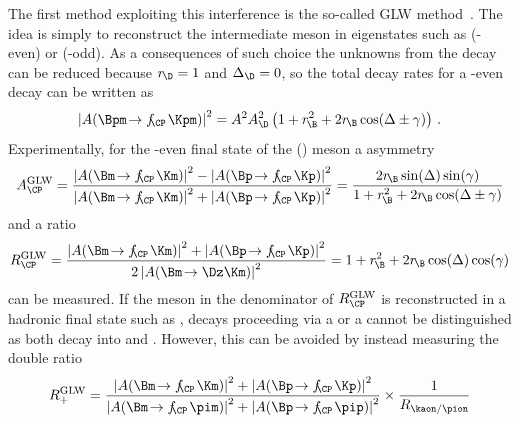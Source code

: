 The first method exploiting this interference is the so-called GLW method~\mbox{\cite{GLW_1, GLW_2}}.
The idea is simply to reconstruct the intermediate \D meson in \CP eigenstates such as \Kp\Km (\CP-even) or \KS\piz (\CP-odd).
As a consequences of such choice the unknowns from the \D decay can be reduced because $r_{\kern -1.0pt\D}=1$ and $\Delta_\D=0$, so the total decay rates for \eg a \CP-even \D decay can be written as
\begin{equation}
\left|A\!\left(\Bpm\!\to f_{\kern -2pt\CP\kern 1pt}\Kpm\right)\right|^2=A^2A_\D^2\left(1+r_{\kern -1.0pt \B}^2+2r_{\kern -1.0pt \B}\cos\!\left(\Delta\pm\gamma\right)\right)\,.\label{eq:totDecRateGLW}
\end{equation}
Experimentally, for the \CP-even final state of the \Dz (\Dzb) meson a \CP asymmetry
\begin{equation}
A_{\CP}^{\text{GLW}}=\frac{\left|A\!\left(\Bm\!\to f_{\kern -2pt\CP\kern 1pt}\Km\right)\right|^2-\left|A\!\left(\Bp\!\to f_{\kern -2pt\CP\kern 1pt}\Kp\right)\right|^2}{\left|A\!\left(\Bm\!\to f_{\kern -2pt\CP\kern 1pt}\Km\right)\right|^2+\left|A\!\left(\Bp\!\to f_{\kern -2pt\CP\kern 1pt}\Kp\right)\right|^2}=\frac{2r_{\kern -1.0pt \B}\sin\!\left(\Delta\right)\sin\!\left(\gamma\right)}{1+r_{\kern -1.0pt \B}^2+2r_{\kern -1.0pt \B}\cos\!\left(\Delta\pm\gamma\right)}\label{eq:ACP_GLW}
\end{equation}
and a \CP ratio
\begin{equation}
R_{\CP}^{\text{GLW}}=\frac{\left|A\!\left(\Bm\!\to f_{\kern -2pt\CP\kern 1pt}\Km\right)\right|^2+\left|A\!\left(\Bp\!\to f_{\kern -2pt\CP\kern 1pt}\Kp\right)\right|^2}{2\left|A\!\left(\Bm\!\to\Dz\Km\right)\right|^2}=1+r_{\kern -1.0pt \B}^2+2r_{\kern -1.0pt \B}\cos\!\left(\Delta\right)\cos\!\left(\gamma\right)\label{eq:RCP_GLW}
\end{equation}
can be measured.
If the \D meson in the denominator of $R_{\CP}^{\text{GLW}}$ is reconstructed in a hadronic final state such as \kaon\pion, decays proceeding via a \Dz or a \Dzb cannot be distinguished as both decay into \Kp\pim and \Km\pip.
However, this can be avoided by instead measuring the double ratio
\begin{equation}
R_{+}^{\text{GLW}}=\frac{\left|A\!\left(\Bm\!\to f_{\kern -2pt\CP\kern 1pt}\Km\right)\right|^2+\left|A\!\left(\Bp\!\to f_{\kern -2pt\CP\kern 1pt}\Kp\right)\right|^2}{\left|A\!\left(\Bm\!\to f_{\kern -2pt\CP\kern 1pt}\pim\right)\right|^2+\left|A\!\left(\Bp\!\to f_{\kern -2pt\CP\kern 1pt}\pip\right)\right|^2}\times\frac{1}{R_{\kaon/\pion}}
\end{equation}
